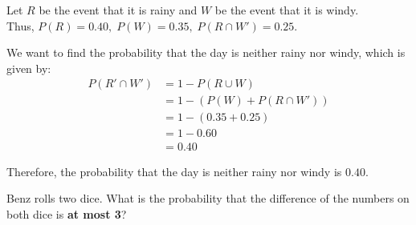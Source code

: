 \documentclass[a4paper, 10pt]{article}
\begin{document}
\begin{solution}
	Let \( R \) be the event that it is rainy and \( W \) be the event that it is windy. \\
	Thus, \( P(R) = 0.40, \; P(W) = 0.35, \; P(R \cap W') = 0.25 \).

	We want to find the probability that the day is neither rainy nor windy, which is given by:
	\begin{align*}
		P(R' \cap W') & = 1 - P(R \cup W)           \\
		              & = 1 - (P(W) + P(R \cap W')) \\
		              & = 1 - (0.35 + 0.25)         \\
		              & = 1 - 0.60                  \\
		              & = 0.40
	\end{align*}

	Therefore, the probability that the day is neither rainy nor windy is \( \boxed{0.40} \).
\end{solution}

\begin{problem}
Benz rolls two dice.
What is the probability that the difference of the numbers on both dice is \textbf{at most 3}?
\end{problem}
\end{document}
